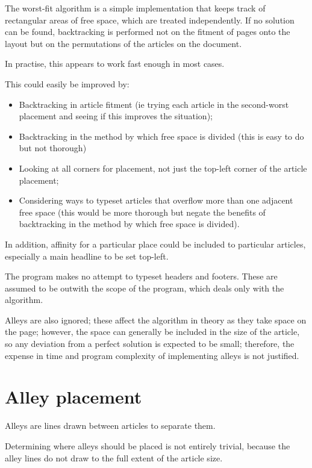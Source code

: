 \documentclass[a4paper]{scrartcl}
\begin{document}
The worst-fit algorithm is a simple implementation that keeps track of
rectangular areas of free space, which are treated independently. If
no solution can be found, backtracking is performed not on the fitment
of pages onto the layout but on the permutations of the articles on
the document.

In practise, this appears to work fast enough in most cases.

This could easily be improved by:

\begin{itemize}
\item Backtracking in article fitment (ie trying each article in the
  second-worst placement and seeing if this improves the situation);
\item Backtracking in the method by which free space is divided (this
  is easy to do but not thorough)
\item Looking at all corners for placement, not just the top-left
  corner of the article placement;
\item Considering ways to typeset articles that overflow more than one
  adjacent free space (this would be more thorough but negate the
  benefits of backtracking in the method by which free space is
  divided).
\end{itemize}

In addition, affinity for a particular place could be included to
particular articles, especially a main headline to be set top-left.

The program makes no attempt to typeset headers and footers. These are
assumed to be outwith the scope of the program, which deals only with
the algorithm.

Alleys are also ignored; these affect the algorithm in theory as they
take space on the page; however, the space can generally be included
in the size of the article, so any deviation from a perfect solution is
expected to be small; therefore, the expense in time and program
complexity of implementing alleys is not justified.

\section*{Alley placement}

Alleys are lines drawn between articles to separate them.

Determining where alleys should be placed is not entirely trivial,
because the alley lines do not draw to the full extent of the article size.
\end{document}
